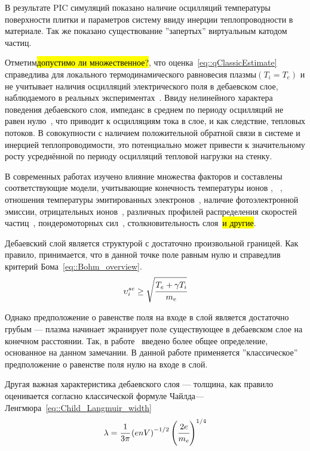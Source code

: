 В результате PIC симуляций показано наличие осцилляций температуры поверхности
плитки и параметров систему ввиду инерции теплопроводности в материале. Так же 
показано существование ''запертых'' виртуальным катодом частиц.

Отметим\hl{допустимо ли множественное?}, что оценка~\eqref{eq::qClassicEstimate}
справедлива для локального термодинамического равновесия плазмы$\left(T_i =
T_e\right)$ и не учитывает наличия осцилляций электрического поля в дебаевском
слое, наблюдаемого в реальных экспериментах~\cite{kirk2006evolution}. Ввиду
нелинейного характера поведения дебаевского слоя, импеданс в среднем по периоду
осцилляций не равен нулю~\cite{myra2015radio}, что приводит к осцилляциям тока в
слое, и как следствие, тепловых потоков. В совокупности с наличием положительной
обратной связи в системе и инерцией теплопроводимости, это потенциально может
привести к значительному росту усреднённой по периоду осцилляций тепловой
нагрузки на стенку.
%

В современных работах изучено влияние множества факторов и составлены
соответствующие модели, учитывающие конечность
температуры ионов \cite{schwager1993effects}, ~\cite{ou2017heat}, отношения
температуры эмитированных электронов~\cite{sheehan2014effects}, наличие
фотоэлектронной эмиссии, отрицательных ионов~\cite{taccogna2014non}, различных
профилей распределения скоростей частиц~\cite{stangeby1984plasma},
пондеромоторных сил~\cite{takamura1998heat}, столкновительность
слоя~\cite{godyak2002smooth}\hl{и другие}.

Дебаевский слой является структурой с достаточно произвольной границей. Как
правило, принимается, что в данной точке поле равным нулю и справедлив критерий
Бома~\eqref{eq::Bohm_overview}.
\begin{equation}
    \upsilon_i^{se} \ge \sqrt{\cfrac{T_e + \gamma T_i}{m_e}}
    \label{eq::Bohm_overview}
\end{equation}

Однако предположение о равенстве поля на входе в слой является достаточно грубым
--- плазма начинает экранирует поле существующее в дебаевском слое на конечном
расстоянии. Так, в работе~\cite{godyak2002smooth} введено более общее
определение, основанное на данном замечании. В данной работе применяется
''классическое'' предположение о равенстве поля нулю на входе в слой.

Другая важная характеристика дебаевского слоя --- толщина, как правило
оценивается согласно классической формуле
Чайлда---Ленгмюра~\eqref{eq::Child_Langmuir_width}
\begin{equation}
    \lambda = \cfrac{1}{3\pi}\left(enV\right)^{-1/2}\left(\cfrac{2e}{m_e}\right)^{1/4}
    \label{eq::Child_Langmuir_width}
\end{equation}

